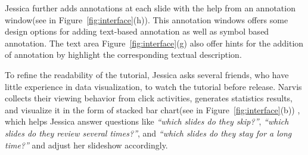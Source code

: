 Jessica further adds annotations at each slide with the help from an annotation window(see in Figure~\ref{fig:interface}(h)). This annotation windows offers some design options for adding text-based annotation as well as symbol based annotation.  The text area Figure~\ref{fig:interface}(g) also offer hints for the addition of annotation by highlight the corresponding textual description. 


To refine the readability of the tutorial, Jessica asks several friends, who have little experience in data visualization, to watch the tutorial before release. Narvis collects their viewing behavior from click activities, generates statistics results, and visualize it in the form of stacked bar chart(see in Figure~\ref{fig:interface}(b)) , which helps Jessica answer questions like \textit{``which slides do they skip?''}, \textit{``which slides do they review several times?''}, and \textit{``which slides do they stay for a long time?''} and adjust her slideshow accordingly. 




